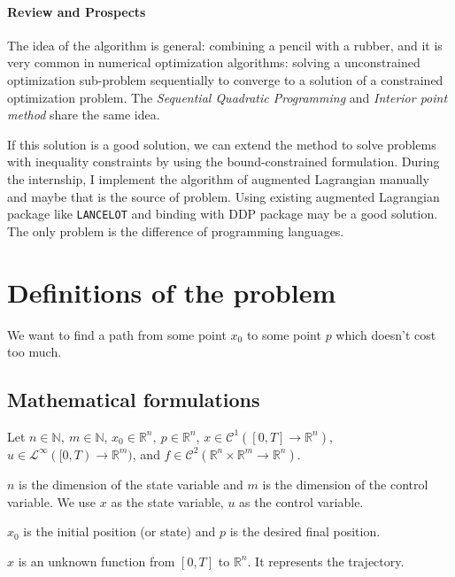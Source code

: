 \documentclass{report}
\begin{document}
\subsubsection{Review and Prospects}
The idea of the algorithm is general: combining a pencil with a rubber, and it is very common in numerical optimization algorithms: solving a unconstrained optimization sub-problem sequentially to converge to a solution of a constrained optimization problem. The \emph{Sequential Quadratic Programming} and \emph{Interior point method} share the same idea.

If this solution is a good solution, we can extend the method to solve problems with inequality constraints by using the bound-constrained formulation\cite{NoceWrig06}. During the internship, I implement the algorithm of augmented Lagrangian manually and maybe that is the source of problem. Using existing augmented Lagrangian package like \texttt{LANCELOT} and binding with DDP package may be a good solution. The only problem is the difference of programming languages.



\chapter{Definitions of the problem}
We want to find a path from some point $x_0$ to some point $p$ which doesn't cost too much.

\section{Mathematical formulations}
Let $n\in \mathbb{N}, \ m \in \mathbb{N}$, $x_0\in \mathbb{R}^n, \ p \in \mathbb{R}^n$, $x \in \mathscr{C}^1([0, T] \to \mathbb{R}^n)$, $u \in \mathscr{L}^\infty([0, T) \to \mathbb{R}^m)$, and $f \in  \mathscr{C}^2(\mathbb{R}^n \times \mathbb{R}^m \to \mathbb{R}^n)$. 

$n$ is the dimension of the state variable and $m$ is the dimension of the control variable. We use $x$ as the state variable, $u$ as the control variable.

$x_0$ is the initial position (or state) and $p$ is the desired final position.

$x$ is an unknown function from $[0, T]$ to $\mathbb{R}^n$. It represents the trajectory.
\end{document}
